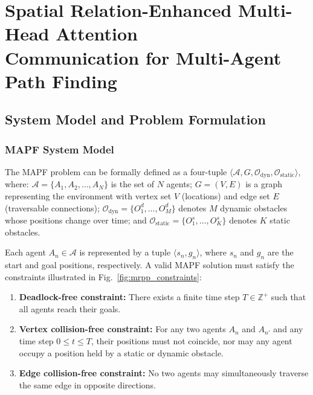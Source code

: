 \documentclass[sigconf]{acmart}
\begin{document}
\section{Spatial Relation-Enhanced Multi-Head Attention\\
Communication for Multi-Agent Path Finding}

\subsection{System Model and Problem Formulation}

\subsubsection{MAPF System Model}

The MAPF problem can be formally defined as a four-tuple
$\langle \mathcal{A}, G, \mathcal{O}_{\mathrm{dyn}},
\mathcal{O}_{\mathrm{static}} \rangle$, where:
$\mathcal{A}=\{A_1, A_2, \ldots, A_N\}$ is the set of $N$ agents;
$G=(V,E)$ is a graph representing the environment with vertex set
$V$ (locations) and edge set $E$ (traversable connections);
$\mathcal{O}_{\mathrm{dyn}}=\{O_1^d, \ldots, O_M^d\}$ denotes $M$
dynamic obstacles whose positions change over time; and
$\mathcal{O}_{\mathrm{static}}=\{O_1^s, \ldots, O_K^s\}$ denotes
$K$ static obstacles.

Each agent $A_n \in \mathcal{A}$ is represented by a tuple
$\langle s_n, g_n \rangle$, where $s_n$ and $g_n$ are the start
and goal positions, respectively.
A valid MAPF solution must satisfy the constraints illustrated
in Fig.~\ref{fig:mrpp_constraints}:

\begin{enumerate}
\item \textbf{Deadlock-free constraint:}
There exists a finite time step $T \in \mathbb{Z}^+$ such that all
agents reach their goals.
\item \textbf{Vertex collision-free constraint:}
For any two agents $A_n$ and $A_{n'}$ and any time step
$0 \le t \le T$, their positions must not coincide, nor may any
agent occupy a position held by a static or dynamic obstacle.
\item \textbf{Edge collision-free constraint:}
No two agents may simultaneously traverse the same edge in
opposite directions.
\end{enumerate}
\end{document}

